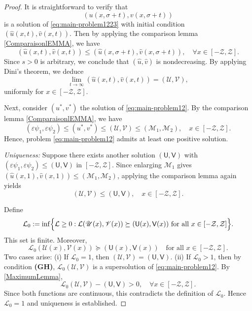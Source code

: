 \documentclass[a4paper,11pt]{amsart}
\theoremstyle{definition}
\numberwithin{equation}{section}
\theoremstyle{definition}
\begin{document}
\begin{proof}
It is straightforward to verify that
\[
(u(x,\sigma+t), v(x,\sigma+t))
\]
is a solution of \eqref{eq:main-problem1223} with initial condition $(\hat{u}(x,t), \hat{v}(x,t))$.
Then by applying the comparison lemma \eqref{ComparaisonlEMMA}, we have
\[
(\hat{u}(x,t),\hat{v}(x,t)) \leq  (\hat{u}(x,\sigma+t), \hat{v}(x,\sigma+t)),
\quad \forall x \in [-\mathcal{Z}, \mathcal{Z}].
\]
Since $s >0$ is arbitrary, we conclude that $(\hat{u},\hat{v})$ is nondecreasing.
By applying Dini's theorem, we deduce
\[
\lim_{t \to \infty} (\hat{u}(x, t), \hat{v}(x,t))=  (\mathscr{U}, \mathscr{V}),
\]
uniformly for $x \in [-\mathcal{Z}, \mathcal{Z}]$.

Next, consider $(u^\ast, v^\ast)$ the solution of \eqref{eq:main-problem12}. By the comparison lemma \eqref{ComparaisonlEMMA}, we have
\[
(\varepsilon \psi_1, \varepsilon \psi_2) \leq (u^\ast, v^\ast) \leq  (\mathscr{U}, \mathscr{V}) \leq (\mathcal{M}_1, \mathcal{M}_2),
\quad x \in [-\mathcal{Z}, \mathcal{Z}].
\]
Hence, problem \eqref{eq:main-problem12} admits at least one positive solution.

\medskip

\emph{Uniqueness:} Suppose there exists another solution $(\mathsf{U}, \mathsf{V})$ with
$(\varepsilon \psi_1, \varepsilon \psi_2) \leq (\mathsf{U}, \mathsf{V})$ in $[-\mathcal{Z}, \mathcal{Z}]$.
Since enlarging $\mathcal{M}_1$ gives $(\hat{u}(x, 1), \hat{v}(x, 1)) \leq (\mathcal{M}_1, \mathcal{M}_2)$, applying the comparison lemma again yields
\[
(\mathscr{U}, \mathscr{V}) \leq (\mathsf{U}, \mathsf{V}), \quad x \in [-\mathcal{Z}, \mathcal{Z}].
\]

Define
\[
\mathcal{L}_0 := \inf \Bigl\{ \mathcal{L} \geq 0 : \mathcal{L} (\mathscr{U}(x), \mathscr{V}(x)) \succeq (\mathsf{U}(x), \mathsf{V}(x))  \text{ for all } x \in [-\mathcal{Z}, \mathcal{Z}] \Bigr\}.
\]
This set is finite. Moreover,
\[
\mathcal{L}_0 (\mathscr{U}(x), \mathscr{V}(x)) \succeq (\mathsf{U}(x), \mathsf{V}(x))\quad \text{for all } x \in [-\mathcal{Z}, \mathcal{Z}].
\]
Two cases arise:
(i) If $\mathcal{L}_0 =1$, then $(\mathscr{U}, \mathscr{V})= (\mathsf{U}, \mathsf{V})$.
(ii) If $\mathcal{L}_0 >1$, then by condition \textbf{(GH)}, $\mathcal{L}_0(\mathscr{U}, \mathscr{V})$ is a supersolution of \eqref{eq:main-problem12}. By \eqref{MaximumLemma},
\[
\mathcal{L}_0(\mathscr{U}, \mathscr{V}) - (\mathsf{U}, \mathsf{V}) >0, \quad \forall x \in [-\mathcal{Z}, \mathcal{Z}].
\]
Since both functions are continuous, this contradicts the definition of $\mathcal{L}_0$.
Hence $\mathcal{L}_0 = 1$ and uniqueness is established.


\end{proof}
\end{document}
